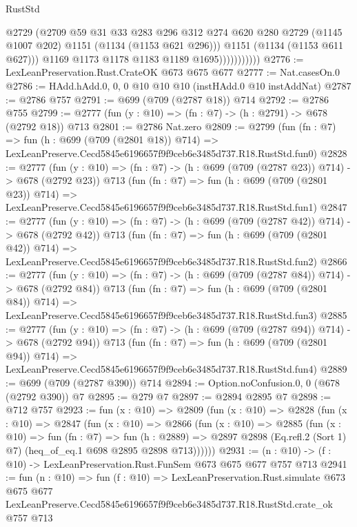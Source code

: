 \begin{lexlean}{RustStd}
\begin{coremodule}
                            @2729
                            (@2709
                              @59
                              @31
                              @33
                              @283
                              @296
                              @312
                              @274
                              @620
                              @280
                              @2729
                              (@1145 @1007 @202)
                              @1151
                              (@1134 (@1153 @621 @296)))
                            @1151
                            (@1134 (@1153 @611 @627)))
                          @1169
                          @1173
                          @1178
                          @1183
                          @1189
                          @1695)))))))))))
@2776 := LexLeanPreservation.Rust.CrateOK @673 @675 @677
@2777 := Nat.casesOn.{0}
@2786 := HAdd.hAdd.{0, 0, 0} @10 @10 @10 (instHAdd.{0} @10 instAddNat)
@2787 := @2786 @757
@2791 := @699 (@709 (@2787 @18)) @714
@2792 := @2786 @755
@2799 := @2777 (fun (y : @10) => (fn : @7) -> (h : @2791) -> @678 (@2792 @18)) @713
@2801 := @2786 Nat.zero
@2809 := @2799
    (fun (fn : @7) =>
    fun (h : @699 (@709 (@2801 @18)) @714) =>
    LexLeanPreserve.Cecd5845e6196657f9f9ceb6e3485d737.R18.RustStd.fun0)
@2828 := @2777
    (fun (y : @10) => (fn : @7) -> (h : @699 (@709 (@2787 @23)) @714) -> @678 (@2792 @23))
    @713
    (fun (fn : @7) =>
    fun (h : @699 (@709 (@2801 @23)) @714) =>
    LexLeanPreserve.Cecd5845e6196657f9f9ceb6e3485d737.R18.RustStd.fun1)
@2847 := @2777
    (fun (y : @10) => (fn : @7) -> (h : @699 (@709 (@2787 @42)) @714) -> @678 (@2792 @42))
    @713
    (fun (fn : @7) =>
    fun (h : @699 (@709 (@2801 @42)) @714) =>
    LexLeanPreserve.Cecd5845e6196657f9f9ceb6e3485d737.R18.RustStd.fun2)
@2866 := @2777
    (fun (y : @10) => (fn : @7) -> (h : @699 (@709 (@2787 @84)) @714) -> @678 (@2792 @84))
    @713
    (fun (fn : @7) =>
    fun (h : @699 (@709 (@2801 @84)) @714) =>
    LexLeanPreserve.Cecd5845e6196657f9f9ceb6e3485d737.R18.RustStd.fun3)
@2885 := @2777
    (fun (y : @10) => (fn : @7) -> (h : @699 (@709 (@2787 @94)) @714) -> @678 (@2792 @94))
    @713
    (fun (fn : @7) =>
    fun (h : @699 (@709 (@2801 @94)) @714) =>
    LexLeanPreserve.Cecd5845e6196657f9f9ceb6e3485d737.R18.RustStd.fun4)
@2889 := @699 (@709 (@2787 @390)) @714
@2894 := Option.noConfusion.{0, 0} (@678 (@2792 @390)) @7
@2895 := @279 @7
@2897 := @2894 @2895 @7
@2898 := @712 @757
@2923 := fun (x : @10) =>
  @2809
    (fun (x : @10) =>
    @2828
      (fun (x : @10) =>
      @2847
        (fun (x : @10) =>
        @2866
          (fun (x : @10) =>
          @2885
            (fun (x : @10) =>
            fun (fn : @7) =>
            fun (h : @2889) =>
            @2897 @2898 (Eq.refl.{2} (Sort 1) @7) (heq_of_eq.{1} @698 @2895 @2898 @713))))))
@2931 := (n : @10) -> (f : @10) -> LexLeanPreservation.Rust.FunSem @673 @675 @677 @757 @713
@2941 := fun (n : @10) =>
  fun (f : @10) =>
  LexLeanPreservation.Rust.simulate
    @673
    @675
    @677
    LexLeanPreserve.Cecd5845e6196657f9f9ceb6e3485d737.R18.RustStd.crate_ok
    @757
    @713
\end{coremodule}
\end{lexlean}
